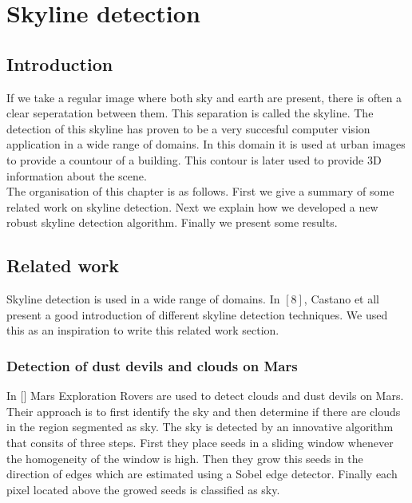

\section{Skyline detection}
 \subsection{Introduction}
If we take a regular image where both sky and earth are present, there
is often a clear seperatation between them. This separation is called the
skyline. %
The detection of this skyline has proven to be a very succesful computer vision
application in a wide range of domains. In this domain it is used at urban
images to provide a countour of a building. This contour is later used to
provide 3D information about the scene.\\
The organisation of this chapter is as follows.  First we give a summary of some
related work on skyline detection.  Next we explain how we developed a new
robust skyline detection algorithm.  Finally we present some results.

\subsection{Related work}
Skyline detection is used in a wide range of domains.
In $[8]$, Castano et all present a good introduction of different skyline
detection techniques. We used this as an inspiration to write this related work section.


\subsubsection{Detection of dust devils and clouds on Mars}
In []%
Mars Exploration Rovers are used to detect clouds and dust devils on Mars.
Their approach is to first identify the sky and then determine if there are
clouds in the region segmented as sky. The sky is detected by an innovative
algorithm that consits of three steps.  First they place seeds in a sliding
window whenever the homogeneity of the window is high. Then they grow this seeds
in the direction of edges which are estimated using a Sobel edge detector.
Finally each pixel located above the growed seeds is classified as sky.\\

